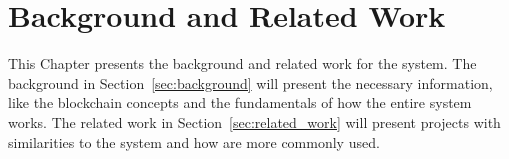 \chapter{Background and Related Work}\label{ch:background_and_related_work}

This Chapter presents the background and related work for the system. The
background in Section~\ref{sec:background} will present the necessary
information, like the blockchain concepts and the fundamentals of how the
entire system works. The related work in Section~\ref{sec:related_work} will
present projects with similarities to the system and how  are
more commonly used.




